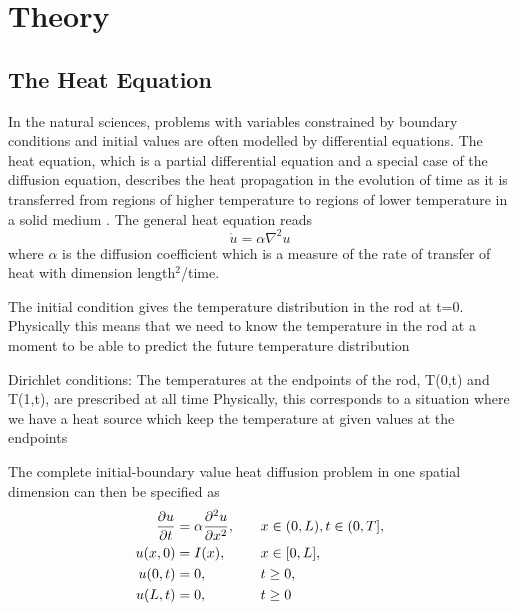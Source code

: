 \section{Theory}\label{sec:Theory}

\subsection{The Heat Equation}\label{sec:Heat eq Theory}
In the natural sciences, problems with variables constrained by boundary conditions and initial values are often modelled by differential equations. The heat equation, which is a partial differential equation and a special case of the diffusion equation, describes the heat propagation in the evolution of time as it is transferred from regions of higher temperature to regions of lower temperature in a solid medium \cite{hpl}. The general heat equation reads
\begin{equation}\label{eq:heq general}
    \dot{u} = \alpha \nabla^2 u
\end{equation}
where $\alpha$ is the diffusion coefficient which is a measure of the rate of transfer of heat with dimension length$^2$/time.

The initial condition gives the temperature distribution
in the rod at t=0. Physically this means that we need to know the
temperature in the rod at a moment to be able to predict the future temperature distribution

Dirichlet conditions:
The temperatures at the endpoints of the rod,
T(0,t) and T(1,t), are prescribed at all time
Physically, this corresponds to a situation where we have a heat source which keep the temperature at given values at the endpoints


The complete initial-boundary value heat diffusion problem in one spatial dimension can then be specified as
\begin{alignat}{2}
    \pdv{u}{t} &= \alpha \pdv[2]{u}{x}, \quad &&x \in (0,L), t\in (0, T], \label{eq:heat eq 1D}\\
    u(x,0) &= I(x), \quad &&x\in [0,L], \\
    u(0,t) &= 0, \quad &&t \geq 0, \\
    u(L,t) &= 0, \quad &&t \geq 0
\end{alignat}

